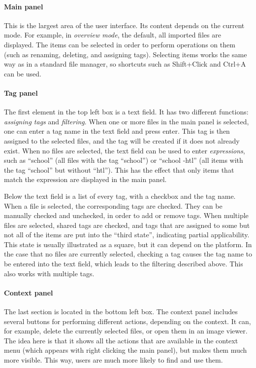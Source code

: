 \paragraph{Main panel} This is the largest area of the user interface. Its content
depends on the current mode. For example, in \emph{overview mode}, the default,
all imported files are displayed. The items can be selected in order to perform
operations on them (such as renaming, deleting, and assigning tags). Selecting
items works the same way as in a standard file manager, so shortcuts
such as Shift+Click and Ctrl+A can be used. %

\paragraph{Tag panel} The first element in the top left box is a text field. It
has two different functions: \emph{assigning tags} and \emph{filtering}.  When
one or more files in the main panel is selected, one can enter a tag name in
the text field and press enter. This tag is then assigned to the selected
files, and the tag will be created if it does not already exist. When no files
are selected, the text field can be used to enter \emph{expressions}, such as
``school'' (all files with the tag ``school'') or ``school -htl'' (all items
with the tag ``school'' but without ``htl''). This has the effect that only
items that match the expression are displayed in the main panel.

Below the text field is a list of every tag, with a checkbox and the tag name.
When a file is selected, the corresponding tags are checked. They can be
manually checked and unchecked, in order to add or remove tags. When multiple
files are selected, shared tags are checked, and tags that are assigned to some
but not all of the items are put into the ``third state'', indicating partial
applicability. This state is usually illustrated as a square, but it can depend
on the platform. In the case that no files are currently selected, checking a
tag causes the tag name to be entered into the text field, which leads to the
filtering described above. This also works with multiple tags.

\paragraph{Context panel} The last section is located in the bottom left box.
The context panel includes several buttons for performing different actions,
depending on the context. It can, for example, delete the currently selected
files, or open them in an image viewer. The idea here is that it shows all the
actions that are available in the context menu (which appears with right
clicking the main panel), but makes them much more visible. This way, users are
much more likely to find and use them.

